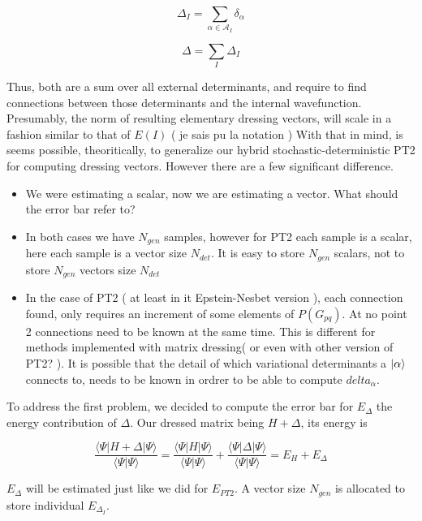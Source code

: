 \documentclass[./thesis.tex]{subfiles}
\begin{document}
\begin{equation}
\Delta_I = \sum_{\alpha \in \mathcal{A}_I} \delta_\alpha
\end{equation}


\begin{equation}
\Delta = \sum_{I} \Delta_I
\end{equation}

Thus, both are a sum over all external determinants, and require to find connections between those determinants and the internal wavefunction. Presumably, the norm of resulting elementary dressing vectors, will scale in a fashion similar to that of $E(I)$ ( je sais pu la notation )
With that in mind, is seems possible, theoritically, to generalize our hybrid stochastic-deterministic PT2 for computing dressing vectors.
However there are a few significant difference.
\begin{itemize}
\item
We were estimating a scalar, now we are estimating a vector. What should the error bar refer to?
\item
In both cases we have $N_{gen}$ samples, however for PT2 each sample is a scalar, here each sample is a vector size $N_{det}$. It is easy to store $N_{gen}$ scalars, not to store $N_{gen}$ vectors size $N_{det}$
\item
In the case of PT2 ( at least in it Epstein-Nesbet version ), each connection found, only requires an increment of some elements of $P(G_{pq})$. At no point 2 connections need to be known at the same time. This is different for methods implemented with matrix dressing( or even with other version of PT2? ). It is possible that the detail of which variational determinants a $\ket \alpha$ connects to, needs to be known in ordrer to be able to compute $delta_\alpha$.
\end{itemize}

To address the first problem, we decided to compute the error bar for $E_{\Delta}$ the energy contribution of $\Delta$. Our dressed matrix being $H + \Delta$, its energy is
    
\begin{equation}
\frac{\langle \Psi |H + \Delta | \Psi\rangle}{\langle \Psi | \Psi \rangle} = \frac{\langle \Psi |H  | \Psi\rangle}{\langle \Psi | \Psi \rangle} + \frac{\langle \Psi |\Delta | \Psi\rangle}{\langle \Psi | \Psi \rangle} = E_H + E_{\Delta} 
\end{equation}


$E_{\Delta}$ will be estimated just like we did for $E_{PT2}$. A vector size $N_{gen}$ is allocated to store individual $E_{\Delta_I}$.
\end{document}

